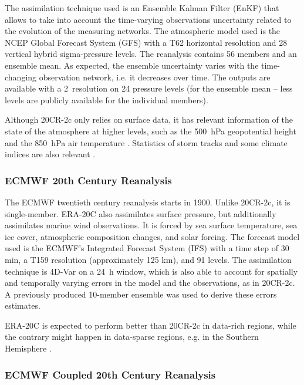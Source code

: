 \documentclass{ametsoc}
\begin{document}
The assimilation technique used is an Ensemble Kalman Filter (EnKF) that allows to take into account the time-varying observations uncertainty related to the evolution of the measuring networks. The atmospheric model used is the NCEP Global Forecast System (GFS) with a T62 horizontal resolution and 28 vertical hybrid sigma-pressure levels. The reanalysis contains 56 members and an ensemble mean. As expected, the ensemble uncertainty varies with the time-changing observation network, i.e. it decreases over time. The outputs are available with a 2\degree\ resolution on 24 pressure levels (for the ensemble mean -- less levels are publicly available for the individual members).

Although 20CR-2c only relies on surface data, it has relevant information of the state of the atmosphere at higher levels, such as the 500~hPa geopotential height and the 850~hPa air temperature \citep{Compo2011}. Statistics of storm tracks and some climate indices are also relevant \citep{Compo2011}.


\subsubsection{ECMWF 20th Century Reanalysis}

The ECMWF twentieth century reanalysis \citep[ERA-20C, ][]{Poli2016} starts in 1900. Unlike 20CR-2c, it is single-member. ERA-20C also assimilates surface pressure, but additionally assimilates marine wind observations. It is forced by sea surface temperature, sea ice cover, atmospheric composition changes, and solar forcing. The forecast model used is the ECMWF’s Integrated Forecast System (IFS) with a time step of 30 min, a T159 resolution (approximately 125 km), and 91 levels. The assimilation technique is 4D-Var on a 24~h window, which is also able to account for spatially and temporally varying errors in the model and the observations, as in 20CR-2c. A previously produced 10-member ensemble was used to derive these errors estimates.

ERA-20C is expected to perform better than 20CR-2c in data-rich regions, while the contrary might happen in data-sparse regions, e.g. in the Southern Hemisphere \citep{Poli2017}.


\subsubsection{ECMWF Coupled 20th Century Reanalysis}
\end{document}
